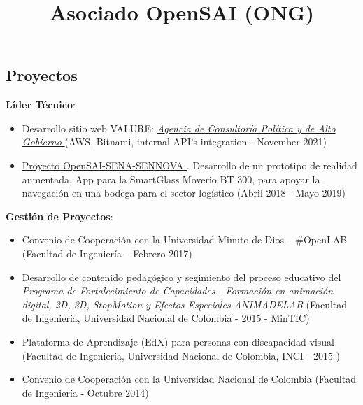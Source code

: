 \documentclass[overlapped,line,final]{../../templates/MichaelDeCorteCV/lib/res}
\begin{document}
\begin{resume}
\section{\sc Proyectos } %
\vspace{0.5cm}
\title{\bf Asociado OpenSAI (ONG)
}
\begin{position}
	\textbf{Líder Técnico}:
	\begin{itemize}
		\item Desarrollo sitio web VALURE: \href{https://valure.com.co}{\textit{Agencia de Consultoría Política y de Alto Gobierno} } (AWS, Bitnami, internal API's integration - November 2021)
		\item \href{https://rea.opensai.org/}{Proyecto OpenSAI-SENA-SENNOVA }. Desarrollo de un prototipo de realidad aumentada, App para la SmartGlass Moverio BT 300, para apoyar la navegación en una bodega para el sector logístico (Abril 2018 - Mayo 2019)
	\end{itemize}
	\textbf{Gestión de Proyectos}:
	\begin{itemize}
		\item Convenio de Cooperación con la Universidad Minuto de Dios – \#OpenLAB (Facultad de Ingeniería – Febrero 2017)
		\item Desarrollo de contenido pedagógico y segimiento del proceso educativo del \textit{Programa de Fortalecimiento de Capacidades - Formación en animación digital, 2D, 3D, StopMotion y Efectos Especiales ANIMADELAB} (Facultad de Ingeniería, Universidad Nacional de Colombia - 2015 - MinTIC)
		\item Plataforma de Aprendizaje (EdX) para personas con discapacidad visual (Facultad de Ingeniería, Universidad Nacional de Colombia, INCI - 2015 )
		\item Convenio de Cooperación con la Universidad Nacional de Colombia (Facultad de Ingeniería - Octubre 2014)
	\end{itemize}

\end{position}
\end{resume}
\end{document}
